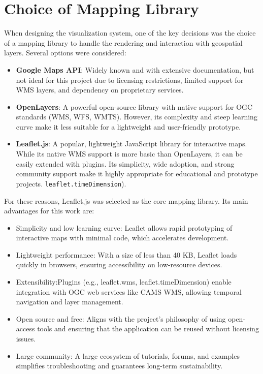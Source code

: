 \section{Choice of Mapping Library}
When designing the visualization system, one of the key decisions was the choice of a mapping library to handle the rendering and interaction with geospatial layers. Several options were considered:
\begin{itemize}
	\item \textbf{Google Maps API}: Widely known and with extensive documentation, but not ideal for this project due to licensing restrictions, limited support for WMS layers, and dependency on proprietary services.
	\item \textbf{OpenLayers}: A powerful open-source library with native support for OGC standards (WMS, WFS, WMTS). However, its complexity and steep learning curve make it less suitable for a lightweight and user-friendly prototype.
	\item \textbf{Leaflet.js}: A popular, lightweight JavaScript library for interactive maps. While its native WMS support is more basic than OpenLayers, it can be easily extended with plugins. Its simplicity, wide adoption, and strong community support make it highly appropriate for educational and prototype projects. \texttt{leaflet.timeDimension}).
\end{itemize}

For these reasons, Leaflet.js was selected as the core mapping library. Its main advantages for this work are:
\begin{itemize}
	\item Simplicity and low learning curve: Leaflet allows rapid prototyping of interactive maps with minimal code, which accelerates development.
	\item Lightweight performance: With a size of less than 40 KB, Leaflet loads quickly in browsers, ensuring accessibility on low-resource devices.
	\item Extensibility:Plugins (e.g., leaflet.wms, leaflet.timeDimension) enable integration with OGC web services like CAMS WMS, allowing temporal navigation and layer management.
	\item Open source and free: Aligns with the project’s philosophy of using open-access tools and ensuring that the application can be reused without licensing issues.
	\item Large community: A large ecosystem of tutorials, forums, and examples simplifies troubleshooting and guarantees long-term sustainability.
\end{itemize}

